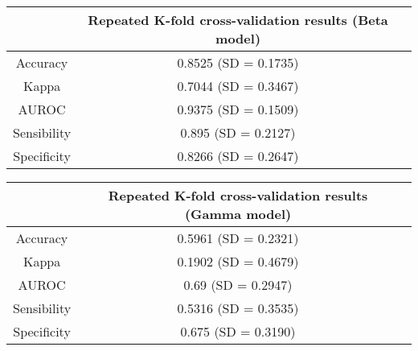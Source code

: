 \documentclass{article}
\begin{document}
\pagebreak

\begin{tabular}{c c c}
\toprule
	& Repeated K-fold cross-validation results (Beta model) & \\
\midrule
Accuracy & 0.8525 (SD = 0.1735) & \\
Kappa & 0.7044 (SD = 0.3467) & \\
AUROC & 0.9375 (SD = 0.1509) & \\
Sensibility & 0.895 (SD = 0.2127) & \\
Specificity &  0.8266 (SD = 0.2647) & \\
\bottomrule
\end{tabular}

\pagebreak

\begin{tabular}{c c c}
\toprule
	& Repeated K-fold cross-validation results (Gamma model) & \\
\midrule
Accuracy & 0.5961 (SD = 0.2321) & \\
Kappa & 0.1902 (SD = 0.4679) & \\
AUROC & 0.69 (SD = 0.2947) & \\
Sensibility & 0.5316 (SD = 0.3535) & \\
Specificity &  0.675 (SD = 0.3190) & \\
\bottomrule
\end{tabular}
\end{document}
